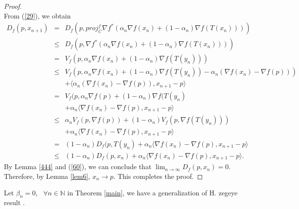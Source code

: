 \documentclass[reqno,b5paper]{amsart}
\theoremstyle{plain}
\theoremstyle{definition}
\numberwithin{equation}{section}
\numberwithin{equation}{section}
\begin{document}
\begin{proof}
\begin{equation}
 \end{equation}
From (\ref{29}), we obtain
\begin{eqnarray*}
D_{f}(p,x_{n+1})&=&D_{f}(p,proj_{C}^{f}\nabla f^{*}(\alpha_{n}\nabla f(x_{n})+(1-\alpha_{n})\nabla f(T(x_{n}))))\\
&\leq&D_{f}(p,\nabla f^{*}(\alpha_{n}\nabla f(x_{n})+(1-\alpha_{n})\nabla f(T(x_{n}))))\\
&=
&V_{f}(p,\alpha_{n}\nabla f(x_{n})+(1-\alpha_{n})\nabla f(T(y_{n})))\\
&\leq& V_{f}(p,\alpha_{n}\nabla f(x_{n})+(1-\alpha_{n})\nabla f(T(y_{n}))-\alpha_{n}(\nabla f(x_{n})-\nabla f(p)))\\
&&+\langle \alpha_{n}(\nabla f(x_{n})-\nabla f(p)),x_{n+1}-p\rangle\\
&=&V_{f}(p,\alpha_{n}\nabla f(p)+(1-\alpha_{n})\nabla f(T(y_{n})\\
&&+ \alpha_{n}\langle \nabla f(x_{n})-\nabla f(p),x_{n+1}-p\rangle\\
&\leq&\alpha_{n} V_{f}(p,\nabla f(p))+(1-\alpha_{n})V_{f}(p,\nabla f(T(y_{n})))\\
&&+ \alpha_{n}\langle \nabla f(x_{n})-\nabla f(p),x_{n+1}-p\rangle\\
&=&(1-\alpha_{n})D_{f}(p,T(y_{n})+\alpha_{n}\langle \nabla f(x_{n})-\nabla f(p),x_{n+1}-p\rangle\\
&\leq&(1-\alpha_{n})D_{f}(p,x_{n})+\alpha_{n}\langle\nabla f(x_{n})-\nabla f(p),x_{n+1}-p\rangle.
\end{eqnarray*}
By Lemma \ref{444} and (\ref{60}), we can conclude that $\lim_{n\to\infty}D_{f}(p,x_{n})=0$. Therefore, by Lemma \ref{lem6}, $x_{n}\to p$. This completes the proof.
\end{proof}
Let $\beta_{n}=0$, \ $\forall n\in\mathbb{N}$ in Theorem \ref{main}, we have a generalization of H. zegeye result \cite{zeg}.
\end{document}
